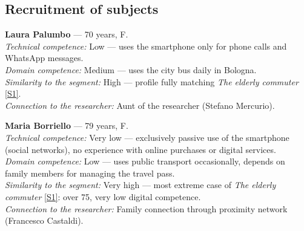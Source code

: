 ﻿\documentclass[11pt,a4paper]{article}
\begin{document}
\vspace{0.2cm}

\subsection*{Recruitment of subjects}
\begin{tcolorbox}[base]

\textbf{Laura Palumbo} --- 70 years, F.\\[0.3cm]
\textit{Technical competence:} Low --- uses the smartphone
only for phone calls and WhatsApp messages.\\[0.2cm]
\textit{Domain competence:} Medium --- uses the city bus
daily in Bologna.\\[0.2cm]
\textit{Similarity to the segment:} High --- profile
fully matching \textit{The elderly commuter}
\hyperref[seg:anziana]{[S1]}.\\[0.2cm]
\textit{Connection to the researcher:} Aunt of the researcher
(Stefano Mercurio).

\vspace{0.2cm}

\textbf{Maria Borriello} --- 79 years, F.\\[0.3cm]
\textit{Technical competence:} Very low --- exclusively passive
use of the smartphone (social networks), no experience
with online purchases or digital services.\\[0.2cm]
\textit{Domain competence:} Low --- uses public transport
occasionally, depends on family members for managing the
travel pass.\\[0.2cm]
\textit{Similarity to the segment:} Very high --- most extreme
case of \textit{The elderly commuter} \hyperref[seg:anziana]{[S1]}:
over 75, very low digital competence.\\[0.2cm]
\textit{Connection to the researcher:} Family connection
through proximity network (Francesco Castaldi).

\end{tcolorbox}

\vspace{0.2cm}
\end{document}
